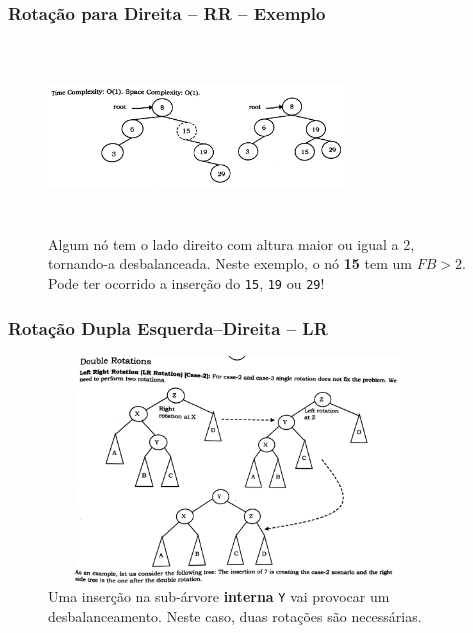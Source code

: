 \begin{frame}
    \frametitle{Rotação para Direita -- RR -- Exemplo}
      
   \begin{figure}[!ht]
     \centering
    \includegraphics[width=8cm, height=5cm]{figs/fig_arvores/avl02RR-example.jpg}

    \caption{Algum nó tem o lado direito com altura maior ou igual a 2, tornando-a desbalanceada. Neste exemplo, o nó \textbf{15} tem um $FB>2$. Pode ter ocorrido a inserção
    do \texttt{15}, \texttt{19} ou \texttt{29}! }
    \end{figure}
\end{frame}


\begin{frame}
    \frametitle{Rotação Dupla Esquerda--Direita -- LR}
      
   \begin{figure}[!ht]
     \centering
    \includegraphics[width=10cm, height=6cm]{figs/fig_arvores/avl04LR.jpg}
    \caption{Uma inserção na sub-árvore \textbf{interna} \texttt{Y} vai provocar um desbalanceamento. Neste caso, duas rotações são necessárias.}
    \end{figure}
\end{frame}

